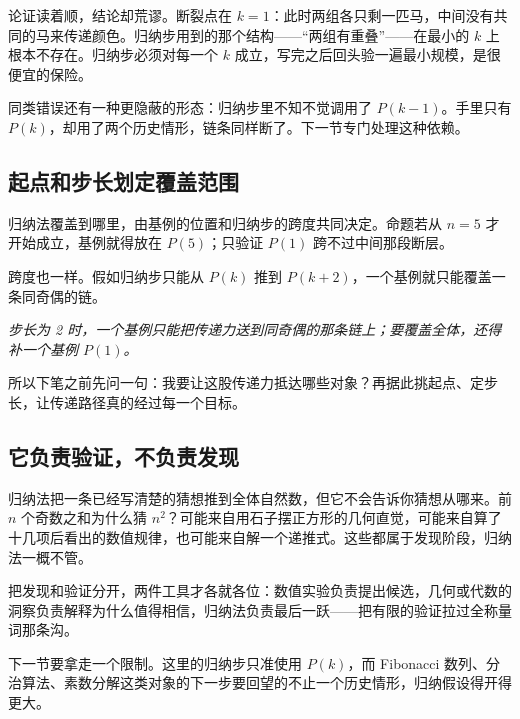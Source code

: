 论证读着顺，结论却荒谬。断裂点在 \(k=1\)：此时两组各只剩一匹马，中间没有共同的马来传递颜色。归纳步用到的那个结构——``两组有重叠''——在最小的 \(k\) 上根本不存在。归纳步必须对每一个 \(k\) 成立，写完之后回头验一遍最小规模，是很便宜的保险。

同类错误还有一种更隐蔽的形态：归纳步里不知不觉调用了 \(P(k-1)\)。手里只有 \(P(k)\)，却用了两个历史情形，链条同样断了。下一节专门处理这种依赖。

\subsection{起点和步长划定覆盖范围}

归纳法覆盖到哪里，由基例的位置和归纳步的跨度共同决定。命题若从 \(n=5\) 才开始成立，基例就得放在 \(P(5)\)；只验证 \(P(1)\) 跨不过中间那段断层。

跨度也一样。假如归纳步只能从 \(P(k)\) 推到 \(P(k+2)\)，一个基例就只能覆盖一条同奇偶的链。

\begin{center}

\emph{步长为 2 时，一个基例只能把传递力送到同奇偶的那条链上；要覆盖全体，还得补一个基例 \(P(1)\)。}
\end{center}

所以下笔之前先问一句：我要让这股传递力抵达哪些对象？再据此挑起点、定步长，让传递路径真的经过每一个目标。

\subsection{它负责验证，不负责发现}

归纳法把一条已经写清楚的猜想推到全体自然数，但它不会告诉你猜想从哪来。前 \(n\) 个奇数之和为什么猜 \(n^2\)？可能来自用石子摆正方形的几何直觉，可能来自算了十几项后看出的数值规律，也可能来自解一个递推式。这些都属于发现阶段，归纳法一概不管。

把发现和验证分开，两件工具才各就各位：数值实验负责提出候选，几何或代数的洞察负责解释为什么值得相信，归纳法负责最后一跃——把有限的验证拉过全称量词那条沟。

下一节要拿走一个限制。这里的归纳步只准使用 \(P(k)\)，而 Fibonacci 数列、分治算法、素数分解这类对象的下一步要回望的不止一个历史情形，归纳假设得开得更大。
